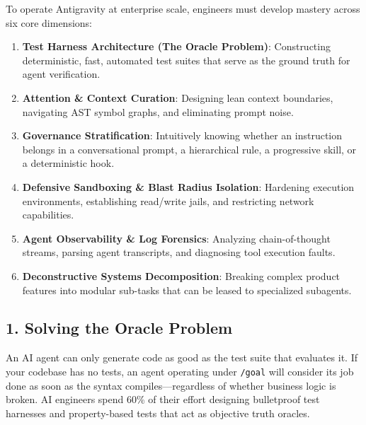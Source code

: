 \documentclass[11pt,a4paper,oneside]{book}
\begin{document}
\begin{conceptbox}
To operate Antigravity at enterprise scale, engineers must develop mastery across six core dimensions:
\begin{enumerate}
    \item \textbf{Test Harness Architecture (The Oracle Problem)}: Constructing deterministic, fast, automated test suites that serve as the ground truth for agent verification.
    \item \textbf{Attention \& Context Curation}: Designing lean context boundaries, navigating AST symbol graphs, and eliminating prompt noise.
    \item \textbf{Governance Stratification}: Intuitively knowing whether an instruction belongs in a conversational prompt, a hierarchical rule, a progressive skill, or a deterministic hook.
    \item \textbf{Defensive Sandboxing \& Blast Radius Isolation}: Hardening execution environments, establishing read/write jails, and restricting network capabilities.
    \item \textbf{Agent Observability \& Log Forensics}: Analyzing chain-of-thought streams, parsing agent transcripts, and diagnosing tool execution faults.
    \item \textbf{Deconstructive Systems Decomposition}: Breaking complex product features into modular sub-tasks that can be leased to specialized subagents.
\end{enumerate}
\end{conceptbox}

\subsection{1. Solving the Oracle Problem}
An AI agent can only generate code as good as the test suite that evaluates it. If your codebase has no tests, an agent operating under \texttt{/goal} will consider its job done as soon as the syntax compiles—regardless of whether business logic is broken. AI engineers spend 60\% of their effort designing bulletproof test harnesses and property-based tests that act as objective truth oracles.
\end{document}
